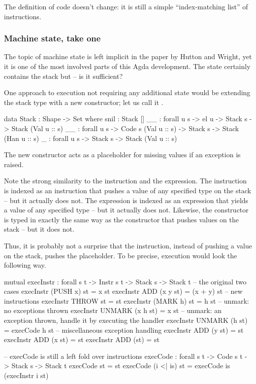 \noindent The definition of code doesn't change: it is still a simple
``index-matching list'' of instructions.

\subsubsection{Machine state, take one}

The topic of machine state is left implicit in the paper by Hutton and Wright,
yet it is one of the most involved parts of this Agda development. The state
certainly contains the stack but -- is it sufficient?

One approach to execution not requiring any additional state would be extending
the stack type with a new constructor;
let us call it \ident{\void\scons\!\!\_}.
\begin{code}
  data Stack : Shape -> Set where
    snil : Stack []
    _\scons\_ : forall {u s} -> el u -> Stack s -> Stack (Val u :: s)
    _\sconsh\_ : forall {u s} -> Code s (Val u :: s) -> Stack s -> Stack (Han u :: s)
    \void\scons\_ : forall {u s} -> Stack s -> Stack (Val u :: s)
\end{code}
The new constructor acts as a placeholder for missing values if an exception is raised.

Note the strong similarity to the  instruction and the 
expression. The instruction  is indexed as an instruction that pushes
a value of any specified type on the stack -- but it actually does not. The 
 expression is indexed as an expression that yields a value of any specified
type -- but it actually does not. Likewise, the \ident{\void} constructor is typed in
exactly the same way as the constructor that pushes values on the stack -- but it does not.

Thus, it is probably not a surprise that the  instruction, instead of pushing
a value on the stack, pushes the \ident{\void} placeholder. To be precise, execution would
look the following way.
\begin{code}
  mutual
    execInstr : forall {s t} -> Instr s t -> Stack s -> Stack t
    -- the original two cases
    execInstr (PUSH x) st = x \scons st
    execInstr ADD (x \scons y \scons st) = (x + y) \scons st
    -- new instructions
    execInstr THROW st = \void\scons st
    execInstr (MARK h) st = h \sconsh st
    -- unmark: no exceptions thrown
    execInstr UNMARK (x \scons h \sconsh st) = x \scons st
    -- unmark: an exception thrown, handle it by executing the handler
    execInstr UNMARK (\void\scons h \sconsh st) = execCode h st
    -- miscellaneous exception handling
    execInstr ADD (\void\scons y \scons st) = \void\scons st
    execInstr ADD (x \scons \void\scons st) = \void\scons st
    execInstr ADD (\void\scons \void\scons st) = \void\scons st

    -- execCode is still a left fold over instructions
    execCode : forall {s t} -> Code s t -> Stack s -> Stack t
    execCode \nil st = st
    execCode (i <| is) st = execCode is (execInstr i st)
\end{code}

